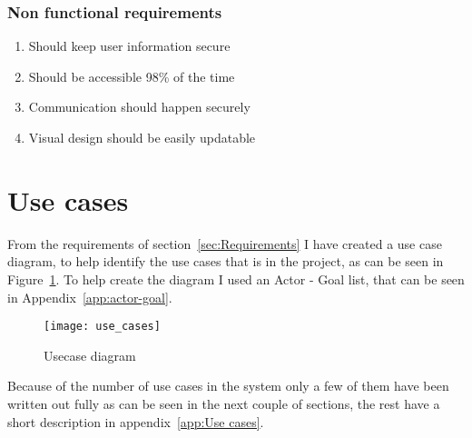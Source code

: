\subsubsection{Non functional requirements}
\label{subs:Non functional requirements}
\begin{enumerate}[label=\textbf{NF\arabic*}]
  \item Should keep user information secure
  \item Should be accessible 98\% of the time
  \item Communication should happen securely
  \item Visual design should be easily updatable
\end{enumerate}


\section{Use cases}
\label{sec:Use cases}
From the requirements of section~\ref{sec:Requirements} I have created a use case diagram, to help identify the use cases that is in the project, as can be seen in Figure~\ref{fig:usecase_diagram}. To help create the diagram I used an Actor - Goal list, that can be seen in Appendix~\ref{app:actor-goal}.

\begin{figure}[!htb]
  \centering
  \texttt{[image: use\_cases]}
  \caption{Usecase diagram}
  \label{fig:usecase_diagram}
\end{figure}

Because of the number of use cases in the system only a few of them have been written out fully as can be seen in the next couple of sections, the rest have a short description in appendix~\ref{app:Use cases}.

